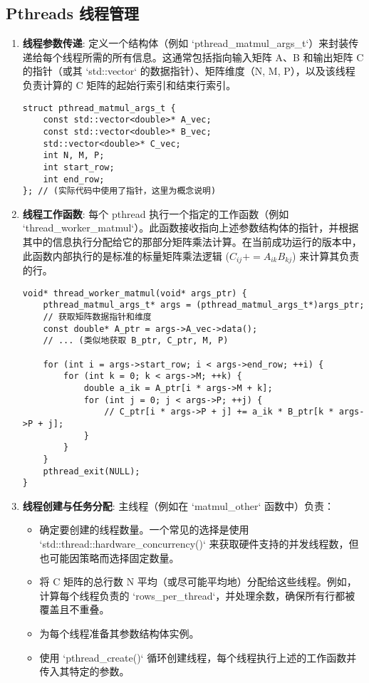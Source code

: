 \documentclass{article}
\begin{document}
\subsection{Pthreads 线程管理}
\begin{enumerate}
    \item \textbf{线程参数传递}: 定义一个结构体（例如 `pthread_matmul_args_t`）来封装传递给每个线程所需的所有信息。这通常包括指向输入矩阵 A、B 和输出矩阵 C 的指针（或其 `std::vector` 的数据指针）、矩阵维度（N, M, P），以及该线程负责计算的 C 矩阵的起始行索引和结束行索引。
    \begin{lstlisting}[caption={线程参数结构体定义}]
struct pthread_matmul_args_t {
    const std::vector<double>* A_vec;
    const std::vector<double>* B_vec;
    std::vector<double>* C_vec;
    int N, M, P;
    int start_row;
    int end_row;
}; // (实际代码中使用了指针，这里为概念说明)
    \end{lstlisting}

    \item \textbf{线程工作函数}: 每个 pthread 执行一个指定的工作函数（例如 `thread_worker_matmul`）。此函数接收指向上述参数结构体的指针，并根据其中的信息执行分配给它的那部分矩阵乘法计算。在当前成功运行的版本中，此函数内部执行的是标准的标量矩阵乘法逻辑 ($C_{ij} += A_{ik} B_{kj}$) 来计算其负责的行。
    \begin{lstlisting}[caption={线程工作函数骨架 (标量核心)}]
void* thread_worker_matmul(void* args_ptr) {
    pthread_matmul_args_t* args = (pthread_matmul_args_t*)args_ptr;
    // 获取矩阵数据指针和维度
    const double* A_ptr = args->A_vec->data();
    // ... (类似地获取 B_ptr, C_ptr, M, P)

    for (int i = args->start_row; i < args->end_row; ++i) {
        for (int k = 0; k < args->M; ++k) {
            double a_ik = A_ptr[i * args->M + k];
            for (int j = 0; j < args->P; ++j) {
                // C_ptr[i * args->P + j] += a_ik * B_ptr[k * args->P + j];
            }
        }
    }
    pthread_exit(NULL);
}
    \end{lstlisting}

    \item \textbf{线程创建与任务分配}: 主线程（例如在 `matmul_other` 函数中）负责：
    \begin{itemize}
        \item 确定要创建的线程数量。一个常见的选择是使用 `std::thread::hardware_concurrency()` 来获取硬件支持的并发线程数，但也可能因策略而选择固定数量。
        \item 将 C 矩阵的总行数 N 平均（或尽可能平均地）分配给这些线程。例如，计算每个线程负责的 `rows_per_thread`，并处理余数，确保所有行都被覆盖且不重叠。
        \item 为每个线程准备其参数结构体实例。
        \item 使用 `pthread_create()` 循环创建线程，每个线程执行上述的工作函数并传入其特定的参数。
    \end{itemize}


\end{enumerate}
\end{document}
